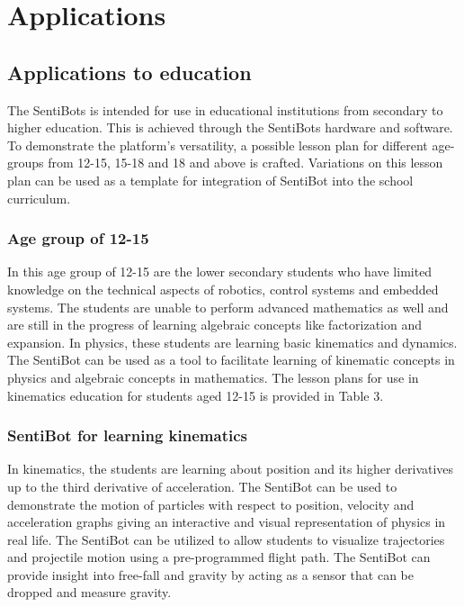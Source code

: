 \documentclass[12pt]{article}
\begin{document}
\section{Applications}

\subsection{Applications to education}

The SentiBots is intended for use in educational institutions from secondary to higher education. This is achieved through the SentiBots hardware and software. To demonstrate the platform’s versatility, a possible lesson plan for different age-groups from 12-15, 15-18 and 18 and above is crafted. Variations on this lesson plan can be used as a template for integration of SentiBot into the school curriculum.

\subsubsection{Age group of 12-15}

In this age group of 12-15 are the lower secondary students who have limited knowledge on the technical aspects of robotics, control systems and embedded systems. The students are unable to perform advanced mathematics as well and are still in the progress of learning algebraic concepts like factorization and expansion. In physics, these students are learning basic kinematics and dynamics. The SentiBot can be used as a tool to facilitate learning of kinematic concepts in physics and algebraic concepts in mathematics. The lesson plans for use in kinematics education for students aged 12-15 is provided in Table 3.

\subsubsection{SentiBot for learning kinematics}

In kinematics, the students are learning about position and its higher derivatives up to the third derivative of acceleration. The SentiBot can be used to demonstrate the motion of particles with respect to position, velocity and acceleration graphs giving an interactive and visual representation of physics in real life.  The SentiBot can be utilized to allow students to visualize trajectories and projectile motion using a pre-programmed flight path. The SentiBot can provide insight into free-fall and gravity by acting as a sensor that can be dropped and measure gravity.
\end{document}
